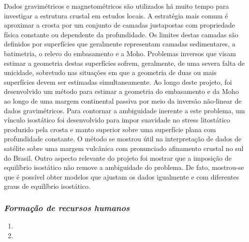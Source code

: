 Dados gravimétricos e magnetométricos são utilizados há muito tempo para investigar 
a estrutura crustal em estudos locais. A estratégia mais comum é aproximar a crosta por 
um conjunto de camadas justapostas com propriedade física constante ou dependente 
da profundidade. Os limites destas camadas são definidos por superfícies que geralmente 
representam camadas sedimentares, a batimetria, o relevo do embasamento e a Moho. 
Problemas inversos que visam estimar a geometria destas superfícies sofrem, geralmente, 
de uma severa falta de unicidade, sobretudo nas situações em que a geometria de duas 
ou mais superfícies devem ser estimadas simultaneamente. Ao longo deste projeto, 
foi desenvolvido um método para estimar a geometria do embasamento e da Moho ao longo 
de uma margem continental passiva por meio da inversão não-linear de dados 
gravimétricos. Para contornar a ambiguidade inerente a este problema, um vínculo 
isostático foi desenvolvido para impor suavidade no stress litostático produzido pela 
crosta e manto superior sobre uma superfície plana com profundidade constante. 
O método se mostrou útil na interpretação de dados de satélite 
sobre uma margem vulcânica com pronunciado afinamento crustal no sul do Brasil. 
Outro aspecto relevante do projeto foi mostrar que a imposição de equilíbrio isostático 
não remove a ambiguidade do problema. De fato, mostrou-se que é possível obter modelos 
que ajustam os dados igualmente e com diferentes graus de equilíbrio isostático.


\subsubsection{\emph{Formação de recursos humanos}}

\begin{enumerate}
	
	\item{}
	
	\item{}
	
\end{enumerate}

